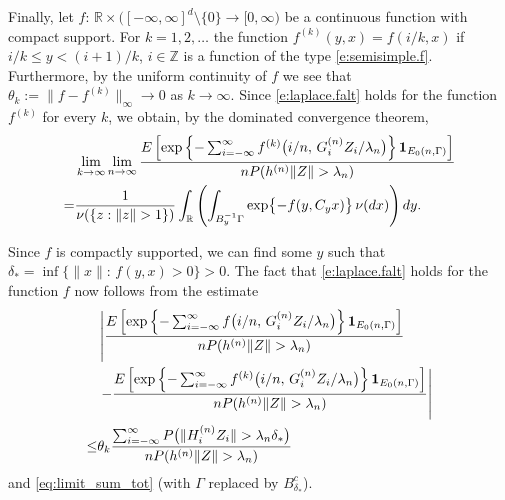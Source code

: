 \documentclass[11pt,reqno]{amsart}
\numberwithin{equation}{section}
\newcommand{\problem}[1]{{\color{red}  {Problems: #1}}}
\theoremstyle{definition}
\theoremstyle{remark}
\newtheorem{remark}{Remark}[section]
\theoremstyle{definition}
\newcommand{\eps}{\varepsilon}
\newcommand{\RR}{\mathbb{R}}
\newcommand{\ZZ}{\mathbb{Z}}
\newcommand{\bbr}{\RR}
\newcommand{\bbz}{\ZZ}
\newcommand{\one}{{\bf 1}}
\begin{document}

 Finally, let $f:\,
\bbr\times \bigl([-\infty,\infty]^d\setminus \{0\}\to [0,\infty)$ be a
continuous function with compact support. For $k=1,2,\ldots$ the
function $f^{(k)}(y,x) = f(i/k,x)$ if $i/k\leq y<(i+1)/k$, $i\in\bbz$ is a
function of the type \eqref{e:semisimple.f}. Furthermore, by the
uniform continuity of $f$ we see that $\theta_k:=\|f-f^{(k)}\|_\infty \to
0$ as $k\to\infty$. Since \eqref{e:laplace.falt} holds for  the
function $f^{(k)}$ for every $k$, we obtain, by the dominated convergence
theorem,
\begin{align*}
&\lim_{k\to\infty} \lim_{n\to\infty} \frac{E\left[\exp\left\{ -\sum_{i=-\infty}^\infty  f^{(k)}\big(i/n, \, G_i^{(n)}
                                    Z_i/\lambda_n\big)\right\} \one_{E_0(n,\Gamma)}\right]}
                              {n P(h^{(n)}\|Z\|>\lambda_n)}\\
=& \frac{1}{\nu(\{z: \|z\|> 1\})}
\int_\bbr \left( \int_{B_y^{-1}\Gamma} \exp\bigl\{ -f(y,C_yx)\bigr\}\,
              \nu(dx)\right)dy.
\end{align*}

Since $f$ is compactly supported, we can find some $y$ such that $\delta_*=\inf\{ \| x\|:\, f(y,x)>0\} > 0$.  
The fact that     \eqref{e:laplace.falt} holds for  the
function $f$ now follows from the estimate
\begin{align*}
&\left| \frac{E\left[\exp\left\{ -\sum_{i=-\infty}^\infty  f\big(i/n, \, G_i^{(n)}
                                    Z_i/\lambda_n\big)\right\} \one_{E_0(n,\Gamma)}\right]}
{n P(h^{(n)}\|Z\|>\lambda_n)} \right. \\
&\left. -\frac{E\left[\exp\left\{ -\sum_{i=-\infty}^\infty  f^{(k)}\big(i/n, \, G_i^{(n)}
                                    Z_i/\lambda_n\big)\right\} \one_{E_0(n,\Gamma)}\right]}
{n P(h^{(n)}\|Z\|>\lambda_n)}\right|\\
\leq& \theta_k \frac{\sum_{i=-\infty}^\infty P\bigl( \| H_i^{(n)}
      Z_i\|>\lambda_n \delta_*\bigr)}{n P(h^{(n)}\|Z\|>\lambda_n)}
\end{align*}
and \eqref{eq:limit_sum_tot} (with $\Gamma$ replaced by
$B_{\delta_*}^c$).  



\end{document}
